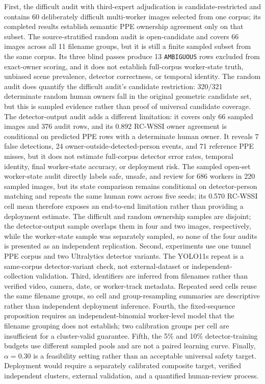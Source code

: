 \documentclass[iicol,pdflatex,sn-mathphys-num]{sn-jnl}
\begin{document}
First, the difficult audit with third-expert adjudication is candidate-restricted and contains 60 deliberately difficult multi-worker images selected from one corpus; its completed results establish semantic PPE ownership agreement only on that subset. The source-stratified random audit is open-candidate and covers 66 images across all 11 filename groups, but it is still a finite sampled subset from the same corpus. Its three blind passes produce 13 \texttt{AMBIGUOUS} rows excluded from exact-owner scoring, and it does not establish full-corpus worker-state truth, unbiased scene prevalence, detector correctness, or temporal identity. The random audit does quantify the difficult audit's candidate restriction: 320/321 determinate random human owners fall in the original geometric candidate set, but this is sampled evidence rather than proof of universal candidate coverage. The detector-output audit adds a different limitation: it covers only 66 sampled images and 376 audit rows, and its 0.892 RC-WSSI owner agreement is conditional on predicted PPE rows with a determinate human owner. It reveals 7 false detections, 24 owner-outside-detected-person events, and 71 reference PPE misses, but it does not estimate full-corpus detector error rates, temporal identity, final worker-state accuracy, or deployment risk. The sampled open-set worker-state audit directly labels safe, unsafe, and review for 686 workers in 220 sampled images, but its state comparison remains conditional on detector-person matching and repeats the same human rows across five seeds; its 0.570 RC-WSSI cell mean therefore exposes an end-to-end limitation rather than providing a deployment estimate. The difficult and random ownership samples are disjoint; the detector-output sample overlaps them in four and two images, respectively, while the worker-state sample was separately sampled, so none of the four audits is presented as an independent replication. Second, experiments use one tunnel PPE corpus and two Ultralytics detector variants. The YOLO11s repeat is a same-corpus detector-variant check, not external-dataset or independent-collection validation. Third, identifiers are inferred from filenames rather than verified video, camera, date, or worker-track metadata. Repeated seed cells reuse the same filename groups, so cell and group-resampling summaries are descriptive rather than independent deployment inference. Fourth, the fixed-sequence proposition requires an independent-binomial worker-level model that the filename grouping does not establish; two calibration groups per cell are insufficient for a cluster-valid guarantee. Fifth, the 5\% and 10\% detector-training budgets use different sampled pools and are not a paired learning curve. Finally, $\alpha=0.30$ is a feasibility setting rather than an acceptable universal safety target. Deployment would require a separately calibrated composite target, verified independent clusters, external validation, and a quantified human-review process.
\end{document}

